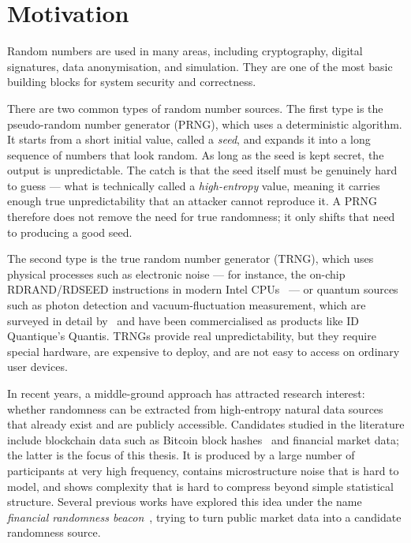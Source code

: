 \documentclass[11pt,titlepage,openany,oneside]{book}  %
\begin{document}
\section{Motivation}
\label{sec:motivation}

Random numbers are used in many areas, including cryptography, digital signatures, data anonymisation, and simulation. They are one of the most basic building blocks for system security and correctness. 

There are two common types of random number sources. The first type is the pseudo-random number generator (PRNG), which uses a deterministic algorithm. It starts from a short initial value, called a \emph{seed}, and expands it into a long sequence of numbers that look random. As long as the seed is kept secret, the output is unpredictable. The catch is that the seed itself must be genuinely hard to guess --- what is technically called a \emph{high-entropy} value, meaning it carries enough true unpredictability that an attacker cannot reproduce it. A PRNG therefore does not remove the need for true randomness; it only shifts that need to producing a good seed. 

The second type is the true random number generator (TRNG), which uses physical processes such as electronic noise --- for instance, the on-chip RDRAND/RDSEED instructions in modern Intel CPUs~\citep{mathew2012intel} --- or quantum sources such as photon detection and vacuum-fluctuation measurement, which are surveyed in detail by~\citet{herrero2017qrng} and have been commercialised as products like ID Quantique's Quantis. TRNGs provide real unpredictability, but they require special hardware, are expensive to deploy, and are not easy to access on ordinary user devices.

In recent years, a middle-ground approach has attracted research interest: whether randomness can be extracted from high-entropy natural data sources that already exist and are publicly accessible. Candidates studied in the literature include blockchain data such as Bitcoin block hashes~\citep{bonneau2015bitcoin,pierrot2018malleability} and financial market data; the latter is the focus of this thesis. It is produced by a large number of participants at very high frequency, contains microstructure noise that is hard to model, and shows complexity that is hard to compress beyond simple statistical structure. Several previous works have explored this idea under the name \emph{financial randomness beacon}~\citep{clark2010beacon,chiba2024lfsr,landis2025beacon}, trying to turn public market data into a candidate randomness source.
\end{document}
